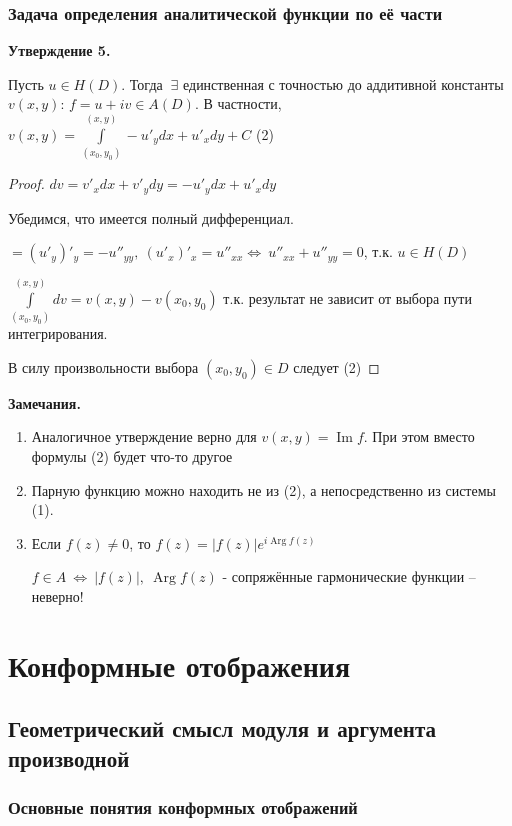 \documentclass[draft]{report}
\newcommand{\mint}[2]{\underset{#1}{\overset{#2}{\int}}}
\newcommand{\LRA}{\Leftrightarrow}
\renewcommand{\Im}{\mathop{\mathrm{Im}}\nolimits}
\newcommand{\Arg}{\mathop{\mathrm{Arg}}\nolimits}
\newcommand{\E}{\ \exists}
\theoremstyle{remark}
\begin{document}
\subsection{Задача определения аналитической функции по её части}

{\bfseries Утверждение 5.}

Пусть $u\in H(D)$. Тогда $\E$ единственная с точностью до аддитивной константы $v(x,y)$: $f=u+iv\in A(D)$. В частности, $v(x,y)=\mint{(x_0,y_0)}{(x,y)}-u'_ydx+u'_xdy+C$ (2)

\begin{proof}
$dv=v'_xdx+v'_ydy=-u'_ydx+u'_xdy$

Убедимся, что имеется полный дифференциал.

$=(u'_y)'_y=-u''_{yy},\ (u'_x)'_x=u''_{xx} \LRA\ u''_{xx}+u''_{yy}=0$, т.к. $u\in H(D)$

$\mint{(x_0,y_0)}{(x,y)}dv=v(x,y)-v(x_0,y_0)$ т.к. результат не зависит от выбора пути интегрирования.

В силу произвольности выбора $(x_0,y_0)\in D$ следует (2)
\end{proof}

{\bfseries Замечания.}
\begin{enumerate}
\item Аналогичное утверждение верно для $v(x,y)=\Im f$. При этом вместо формулы (2) будет что-то другое
\item Парную функцию можно находить не из (2), а непосредственно из системы (1).
\item Если $f(z)\neq 0$, то $f(z)=|f(z)|e^{i\Arg f(z)}$

$f\in A\ \LRA\ |f(z)|,\ \Arg f(z)$ - сопряжённые гармонические функции -- неверно!
\end{enumerate}

\chapter{Конформные отображения}

\section{Геометрический смысл модуля и аргумента производной}

\subsection{Основные понятия конформных отображений}
\end{document}
